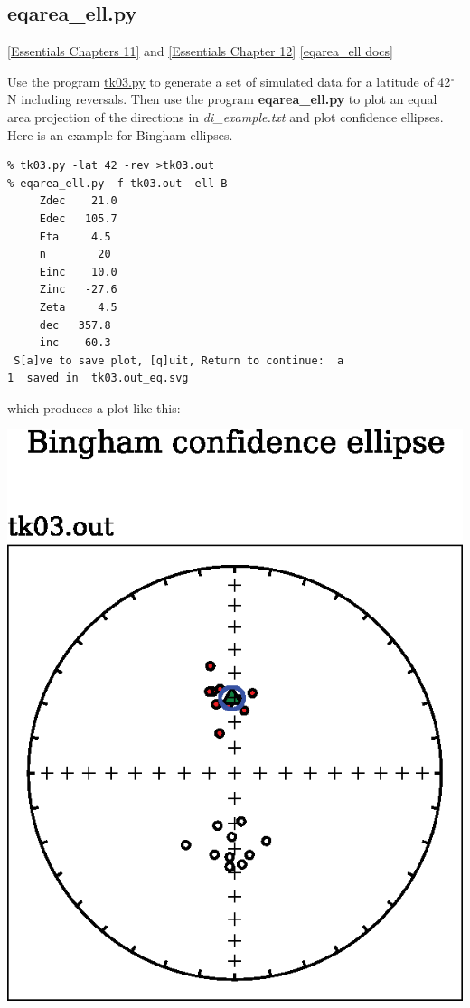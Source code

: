 \documentclass[11pt]{book}
\begin{document}
{{
\subsection{eqarea\_ell.py}
\href{http://earthref.org/MAGIC/books/Tauxe/Essentials/WebBook3ch11.html#ch11}{ [Essentials Chapters 11]} and \href{http://earthref.org/MAGIC/books/Tauxe/Essentials/WebBook3ch12.html#ch12}{ [Essentials Chapter 12]}
\href{https://github.com/PmagPy/PmagPy/blob/master/programs/eqarea_ell.py}{[eqarea\_ell docs]}

Use the program \href{#tk03.py}{tk03.py} to generate a set of simulated data for a latitude of 42$^{\circ}$N including reversals.
Then use the program {\bf eqarea\_ell.py} to
plot an equal area projection of the directions in {\it di\_example.txt} and plot confidence ellipses.  Here is an example for
Bingham ellipses.


\begin{verbatim}
% tk03.py -lat 42 -rev >tk03.out
% eqarea_ell.py -f tk03.out -ell B
     Zdec    21.0
     Edec   105.7
     Eta     4.5
     n        20
     Einc    10.0
     Zinc   -27.6
     Zeta     4.5
     dec   357.8
     inc    60.3
 S[a]ve to save plot, [q]uit, Return to continue:  a
1  saved in  tk03.out_eq.svg
\end{verbatim}

which produces a plot like this:

\includegraphics[width=12 cm]{EPSfiles/eqarea_ell.eps}

}}
\end{document}
